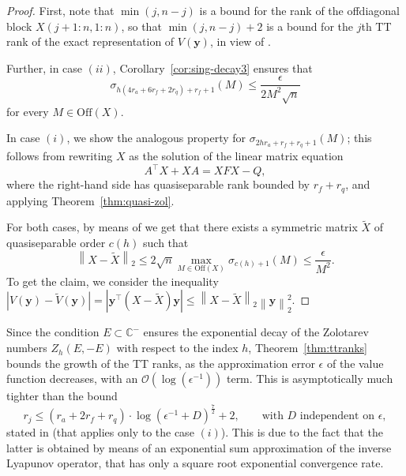 \documentclass[a4paper,10pt]{article}
\newcommand{\norm}[1]{\left\lVert#1\right\rVert}
\begin{document}
\begin{proof}
First, note that $\min(j,n-j)$ is a bound for the rank of the offdiagonal block $X(j+1:n, 1:n)$, so that $\min(j,n-j)+2$ is a bound for the $j$th TT rank of the exact representation of $V(\mathbf y)$, in view of \cite[Theorem 4.2]{dolgov13}. 

Further, in case $(ii)$, Corollary~\eqref{cor:sing-decay3} ensures that
$$
\sigma_{h(4r_a+6r_f+2r_q)+r_f+1}(M)\le \frac{\epsilon}{2M^2\sqrt n}
$$
for every $M\in\mathrm{Off}(X)$. 

In case $(i)$, we show the analogous property for $\sigma_{2hr_a+r_f+r_q+1}(M)$; this follows from  rewriting $X$ as the solution of the linear matrix equation
\begin{equation*}\label{eq:proof}
A^\top X+XA= XFX-Q,
\end{equation*}
where the right-hand side has quasiseparable rank bounded by $r_f+r_q$, and applying Theorem~\ref{thm:quasi-zol}. %

For both cases, by means of \cite[Theorem 2.16]{massei18} we get that there exists a symmetric matrix $\widetilde X$ of quasiseparable order $c(h)$ such that
$$
\norm{X-\widetilde X}_2\le 2\sqrt{n} \max_{M\in\mathrm{Off}(X)}\sigma_{c(h)+1}(M)\le\frac{\epsilon}{M^2}.
$$
To get the claim, we consider the inequality $|V(\mathbf y)-\widetilde V(\mathbf y)|=|\mathbf y^\top(X-\widetilde X)\mathbf y|\le \norm{X-\widetilde X}_2\norm{\mathbf y}_{2}^2$.
\end{proof}
Since the condition $E\subset \mathbb C^{-}$ ensures the exponential decay of the Zolotarev numbers $Z_h(E,-E)$ with respect to the index $h$, Theorem~\ref{thm:ttranks} bounds the growth of the TT ranks, as the approximation error $\epsilon$ of the value function decreases, with an $\mathcal O(\log(\epsilon^{-1}))$ term. This is asymptotically much tighter than the bound
\begin{equation*}\label{eq:sergey-bound}
r_j\le (r_a + 2r_f+r_q)\cdot \log(\epsilon^{-1} + D)^{\frac 72}+2, \qquad \text{with $D$ independent on $\epsilon$},
\end{equation*}
stated in  \cite[Theorem 3.1]{dolgov21} (that applies only to the case $(i)$). This is due to the fact that the latter is obtained by means of an exponential sum approximation of the inverse Lyapunov operator, that has only a square root exponential convergence rate. 
\end{document}
